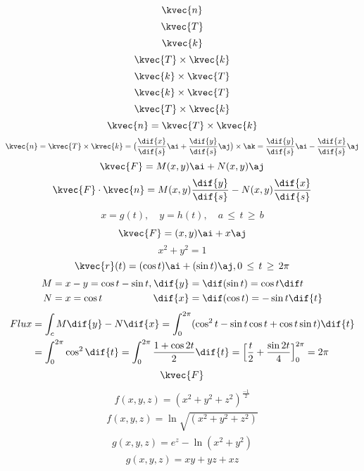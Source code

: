 \[ \kvec {n}\]
\[ \kvec {T}\]
\[\kvec {k}\]
\[\kvec{T} \times \kvec{k}\]
\[\kvec{k} \times \kvec{T}\]
\[\kvec{k} \times \kvec{T}\]
\[\kvec{T} \times \kvec{k}\]
\[\kvec{n} = \kvec{T} \times \kvec{k}	\]
\begin{align*}
\kvec{n} = \kvec{T} \times \kvec{k} = \big (\frac{\dif {x}}{\dif {s}} \ai + \frac{\dif {y}}{\dif {s}} \aj \big ) \times \ak = \frac{\dif {y}}{\dif {s}}\ai - \frac{\dif {x}}{\dif {s}} \aj
\end{align*}
\[\kvec{F}=M(x,y)\ai +N(x,y)\aj 	\]
\begin{align*}
\kvec{F} \cdot \kvec{n} = M (x,y) \frac{\dif{y}}{\dif{s}} - N(x,y)\frac{\dif {x}}{\dif {s}}
\end{align*}
\begin{align*}
x=g(t),\quad y=h(t),\quad a\, \le \,t\, \ge \, b
\end{align*}
\[\kvec{F}=(x,y)\ai + x\aj 	\]
\[x^{2}+y^{2}=1\]
\[\kvec{r}(t)=(\cos t)\ai + (\sin t)\aj , 0\, \le \, t \, \ge \, 2\pi\]
\begin{gather}
\begin{align*}
M&=x-y=\cos t - \sin t, \,\\
N&=x=\cos t \,
\end{align*}
\begin{align*}
\dif{y}&=\dif(\sin t)=\cos t \dif t \\
\dif{x}&=\dif(\cos t)=-\sin t \dif {t}
\end{align*}
\end{gather}
\begin{align*}
Flux&=\int_{c} M\dif{y}-N\dif {x} = \int_{0}^{2\pi}(\cos ^{2} t-\sin t \cos t + \cos t \sin t) \dif{t}\\
&=\int_{0}^{2\pi}\cos ^{2}\dif{t}=\int_{0}^{2\pi} \frac {1+\cos 2t}{2} \dif{t}=\Big [\frac{t}{2}+\frac{\sin 2t}{4} \Big ]_{0}^{2\pi}= 2\pi
\end{align*}
\[\kvec{F}\]
\begin{align*}
f(x,y,z)= (x^{2}+y^{2}+z^{2})^{\frac{-1}{2}}
\end{align*}
\begin{align*}
f(x,y,z)= \ln \sqrt{(x^{2}+y^{2}+z^{2})}
\end{align*}
\begin{align*}
g(x,y,z)= e^{z}-\ln(x^{2}+y^{2})
\end{align*}
\begin{align*}
g(x,y,z)=xy+yz+xz
\end{align*}
